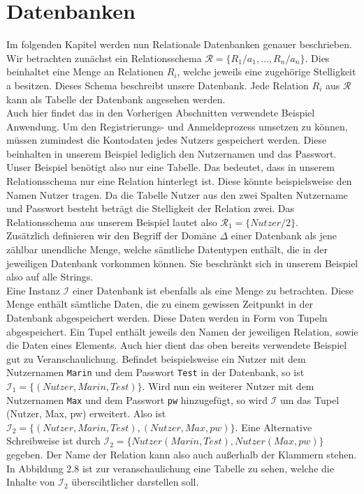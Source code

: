 \section{Datenbanken}
Im folgenden Kapitel werden nun Relationale Datenbanken genauer beschrieben. Wir betrachten zunächst ein Relationsschema  $\mathcal{R} = \{R_1/a_1,…,R_n/a_n\}$. Dies beinhaltet eine Menge an Relationen $R_i$, welche jeweils eine zugehörige Stelligkeit a besitzen. Dieses Schema beschreibt unsere Datenbank. Jede Relation $R_i$ aus  $\mathcal{R}$ kann als Tabelle der Datenbank angesehen werden. \\
Auch hier findet das in den Vorherigen Abschnitten verwendete Beispiel Anwendung. Um den Registrierungs- und Anmeldeprozess umsetzen zu können, müssen zumindest die Kontodaten jedes Nutzers gespeichert werden. Diese beinhalten in unserem Beispiel lediglich den Nutzernamen und das Passwort. Unser Beispiel benötigt also nur eine Tabelle. Das bedeutet, dass in unserem Relationsschema nur eine Relation hinterlegt ist. Diese könnte beispielsweise den Namen Nutzer tragen. Da die Tabelle Nutzer aus den zwei Spalten Nutzername und Passwort besteht beträgt die Stelligkeit der Relation zwei. Das Relationsschema aus unserem Beispiel lautet also $\mathcal{R}_1=\{Nutzer/2\}$. \\
Zusätzlich definieren wir den Begriff der Domäne ${\Delta}$ einer Datenbank als jene zählbar unendliche Menge, welche sämtliche Datentypen enthält, die in der jeweiligen Datenbank vorkommen können. Sie beschränkt sich in unserem Beispiel also auf alle Strings. \\
Eine Instanz $\mathcal{I}$ einer Datenbank ist ebenfalls als eine Menge zu betrachten. Diese Menge enthält sämtliche Daten, die zu einem gewissen Zeitpunkt in der Datenbank abgespeichert werden. Diese Daten werden in Form von Tupeln abgespeichert. Ein Tupel enthält jeweils den Namen der jeweiligen Relation, sowie die Daten eines Elements. Auch hier dient das oben bereits verwendete Beispiel gut zu Veranschaulichung. Befindet beispielsweise ein Nutzer mit dem Nutzernamen \texttt{Marin} und dem Passwort \texttt{Test} in der Datenbank, so ist $\mathcal{I}_1 = \{(Nutzer, Marin, Test)\}$. Wird nun ein weiterer Nutzer mit dem Nutzernamen \texttt{Max} und dem Passwort \texttt{pw} hinzugefügt, so wird $\mathcal{I}$ um das Tupel (Nutzer, Max, pw) erweitert. Also ist $\mathcal{I}_2 =\{(Nutzer, Marin, Test), (Nutzer, Max, pw)\}$. Eine Alternative Schreibweise ist durch $\mathcal{I}_2 = \{Nutzer(Marin, Test), Nutzer(Max, pw)\}$ gegeben. Der Name der Relation kann also auch außerhalb der Klammern stehen.\\
In Abbildung 2.8 ist zur veranschaulichung eine Tabelle zu sehen, welche die Inhalte von $\mathcal{I}_2$ überscihtlicher darstellen soll.

